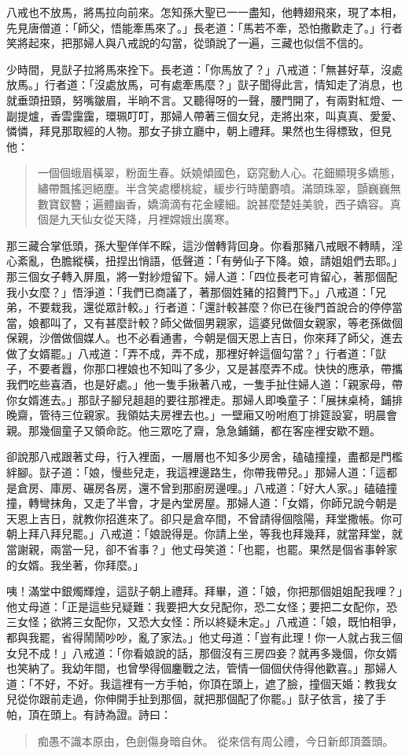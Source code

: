 八戒也不放馬，將馬拉向前來。怎知孫大聖已一一盡知，他轉翅飛來，現了本相，先見唐僧道：「師父，悟能牽馬來了。」長老道：「馬若不牽，恐怕撒歡走了。」行者笑將起來，把那婦人與八戒說的勾當，從頭說了一遍，三藏也似信不信的。

少時間，見獃子拉將馬來拴下。長老道：「你馬放了？」八戒道：「無甚好草，沒處放馬。」行者道：「沒處放馬，可有處牽馬麼？」獃子聞得此言，情知走了消息，也就垂頭扭頸，努嘴皺眉，半晌不言。又聽得呀的一聲，腰門開了，有兩對紅燈、一副提爐，香雲靄靄，環珮叮叮，那婦人帶著三個女兒，走將出來，叫真真、愛愛、憐憐，拜見那取經的人物。那女子排立廳中，朝上禮拜。果然也生得標致，但見他：
\begin{quote}
一個個蛾眉橫翠，粉面生春。妖嬈傾國色，窈窕動人心。花鈿顯現多嬌態，繡帶飄搖迥絕塵。半含笑處櫻桃綻，緩步行時蘭麝噴。滿頭珠翠，顫巍巍無數寶釵簪；遍體幽香，嬌滴滴有花金縷細。說甚麼楚娃美貌，西子嬌容。真個是九天仙女從天降，月裡嫦娥出廣寒。
\end{quote}

那三藏合掌低頭，孫大聖佯佯不睬，這沙僧轉背回身。你看那豬八戒眼不轉睛，淫心紊亂，色膽縱橫，扭捏出悄語，低聲道：「有勞仙子下降。娘，請姐姐們去耶。」那三個女子轉入屏風，將一對紗燈留下。婦人道：「四位長老可肯留心，著那個配我小女麼？」悟淨道：「我們已商議了，著那個姓豬的招贅門下。」八戒道：「兄弟，不要栽我，還從眾計較。」行者道：「還計較甚麼？你已在後門首說合的停停當當，娘都叫了，又有甚麼計較？師父做個男親家，這婆兒做個女親家，等老孫做個保親，沙僧做個媒人。也不必看通書，今朝是個天恩上吉日，你來拜了師父，進去做了女婿罷。」八戒道：「弄不成，弄不成，那裡好幹這個勾當？」行者道：「獃子，不要者囂，你那口裡娘也不知叫了多少，又是甚麼弄不成。快快的應承，帶攜我們吃些喜酒，也是好處。」他一隻手揪著八戒，一隻手扯住婦人道：「親家母，帶你女婿進去。」那獃子腳兒趄趄的要往那裡走。那婦人即喚童子：「展抹桌椅，鋪排晚齋，管待三位親家。我領姑夫房裡去也。」一壁廂又吩咐庖丁排筵設宴，明晨會親。那幾個童子又領命訖。他三眾吃了齋，急急鋪鋪，都在客座裡安歇不題。

卻說那八戒跟著丈母，行入裡面，一層層也不知多少房舍，磕磕撞撞，盡都是門檻絆腳。獃子道：「娘，慢些兒走，我這裡邊路生，你帶我帶兒。」那婦人道：「這都是倉房、庫房、碾房各房，還不曾到那廚房邊哩。」八戒道：「好大人家。」磕磕撞撞，轉彎抹角，又走了半會，才是內堂房屋。那婦人道：「女婿，你師兄說今朝是天恩上吉日，就教你招進來了。卻只是倉卒間，不曾請得個陰陽，拜堂撒帳。你可朝上拜八拜兒罷。」八戒道：「娘說得是。你請上坐，等我也拜幾拜，就當拜堂，就當謝親，兩當一兒，卻不省事？」他丈母笑道：「也罷，也罷。果然是個省事幹家的女婿。我坐著，你拜麼。」

咦！滿堂中銀燭輝煌，這獃子朝上禮拜。拜畢，道：「娘，你把那個姐姐配我哩？」他丈母道：「正是這些兒疑難：我要把大女兒配你，恐二女怪；要把二女配你，恐三女怪；欲將三女配你，又恐大女怪：所以終疑未定。」八戒道：「娘，既怕相爭，都與我罷，省得鬧鬧吵吵，亂了家法。」他丈母道：「豈有此理！你一人就占我三個女兒不成！」八戒道：「你看娘說的話，那個沒有三房四妾？就再多幾個，你女婿也笑納了。我幼年間，也曾學得個鏖戰之法，管情一個個伏侍得他歡喜。」那婦人道：「不好，不好。我這裡有一方手帕，你頂在頭上，遮了臉，撞個天婚：教我女兒從你跟前走過，你伸開手扯到那個，就把那個配了你罷。」獃子依言，接了手帕，頂在頭上。有詩為證。詩曰：
\begin{quote}
痴愚不識本原由，色劍傷身暗自休。
從來信有周公禮，今日新郎頂蓋頭。
\end{quote}

